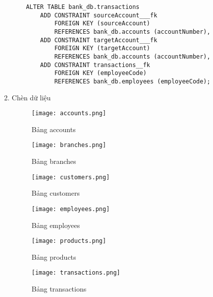 \begin{enumerate}[label=\alph*.]
\begin{lstlisting}
    ALTER TABLE bank_db.transactions
        ADD CONSTRAINT sourceAccount___fk
            FOREIGN KEY (sourceAccount) 
            REFERENCES bank_db.accounts (accountNumber),
        ADD CONSTRAINT targetAccount___fk
            FOREIGN KEY (targetAccount) 
            REFERENCES bank_db.accounts (accountNumber),
        ADD CONSTRAINT transactions__fk
            FOREIGN KEY (employeeCode) 
            REFERENCES bank_db.employees (employeeCode);
    \end{lstlisting}

    \item Chèn dữ liệu
    
    \begin{figure}[H]
        \centering
        \texttt{[image: accounts.png]}
        \caption{Bảng accounts}
    \end{figure}

    \begin{figure}[H]
        \centering
        \texttt{[image: branches.png]}
        \caption{Bảng branches}
    \end{figure}

    \begin{figure}[H]
        \centering
        \texttt{[image: customers.png]}
        \caption{Bảng customers}
    \end{figure}

    \begin{figure}[H]
        \centering
        \texttt{[image: employees.png]}
        \caption{Bảng employees}
    \end{figure}

    \begin{figure}[H]
        \centering
        \texttt{[image: products.png]}
        \caption{Bảng products}
    \end{figure}

    \begin{figure}[H]
        \centering
        \texttt{[image: transactions.png]}
        \caption{Bảng transactions}
    \end{figure}

\end{enumerate}
